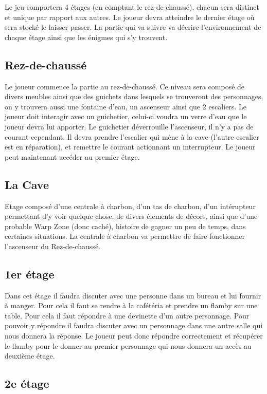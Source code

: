 \documentclass[a4paper,10pt]{article}
\begin{document}
Le jeu comportera 4 étages (en comptant le rez-de-chaussé), chacun sera distinct et unique par rapport aux autres. Le joueur devra atteindre le dernier étage où sera stocké le laisser-passer.
La partie qui va suivre va décrire l'environnement de chaque étage ainsi que les énigmes qui s'y trouvent.

\subsection{Rez-de-chaussé}

Le joueur commence la partie au rez-de-chaussé. Ce niveau sera composé de divers meubles ainsi que des guichets dans lesquels se trouveront des personnages, on y trouvera aussi une fontaine d'eau, un ascenseur ainsi que 2 escaliers. Le joueur doit interagir avec un guichetier, celui-ci voudra un verre d'eau que le joueur devra lui apporter. Le guichetier déverrouille l'ascenseur, il n'y a pas de courant cependant. Il devra prendre l'escalier qui mène à la cave (l'autre escalier est en réparation), et remettre le courant actionnant un interrupteur. Le joueur peut maintenant accéder au premier étage.

\subsection{La Cave}

Etage composé d'une centrale à charbon, d'un tas de charbon, d'un intérupteur permettant d'y voir quelque chose, de divers élements de décors, ainsi que d'une probable Warp Zone (donc caché), histoire de gagner un peu de temps, dans certaines situations. La centrale à charbon va permettre de faire fonctionner l'ascenseur du Rez-de-chaussé.

\subsection{1er étage}

Dans cet étage il faudra discuter avec une personne dans un bureau et lui fournir à manger. Pour cela il faut se rendre à la cafétéria et prendre un flamby sur une table. Pour cela il faut répondre à une devinette d'un autre personnage. Pour pouvoir y répondre il faudra discuter avec un personnage dans une autre salle qui nous donnera la réponse. Le joueur peut donc répondre correctement et récupérer le flamby pour le donner au premier personnage qui nous donnera un accès au deuxième étage.

\subsection{2e étage}
\end{document}
